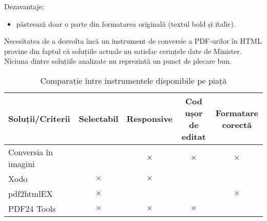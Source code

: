 \noindent
Dezavantaje:
\begin{itemize}
	\item păstrează doar o parte din formatarea originală (textul bold și italic).
\end{itemize}

\vspace{3em}
Necesitatea de a dezvolta încă un instrument de conversie a PDF-urilor în HTML provine din faptul că soluțiile actuale nu satisfac cerințele date de Minister. Niciuna dintre soluțiile analizate nu reprezintă un punct de plecare bun.

\begin{table}[H]
	\centering
	\begin{tabular}{| l | c | c | c | c |}
		\hline
		\textbf{Soluții/Criterii} & Selectabil & Responsive & Cod ușor de editat & Formatare corectă \\ \hline
		Conversia în imagini &  & $\times$ & $\times$ & $\times$ \\ \hline
		Xodo & $\times$ & $\times$ &  & \\ \hline
		pdf2htmlEX & $\times$ &  &  & $\times$ \\ \hline
		PDF24 Tools & $\times$ & $\times$ & $\times$ & \\ \hline
	\end{tabular}
	\caption{Comparație între instrumentele disponibile pe piață}
\end{table}